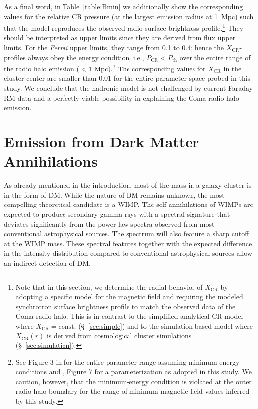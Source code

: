 \documentclass[12pt,manuscript]{aastex}
\def\Fermi{{\em Fermi}\xspace}
\newcommand{\rmn}{\mathrm}
\newcommand{\CR}{\mathrm{CR}}
\begin{document}
As a final word, in Table~\ref{table:Bmin} we additionally show the corresponding values for the
relative CR pressure (at the largest emission radius at 1~Mpc) such that the model reproduces the
observed radio surface brightness profile.\footnote{Note that in this section, we determine the
radial behavior of $X_\CR$ by adopting a specific model for the magnetic field and requiring the
modeled synchrotron surface brightness profile to match the observed data of the Coma radio
halo. This is in contrast to the simplified analytical CR model where $X_\CR=\rmn{const.}$
(\S~\ref{sec:simple}) and to the simulation-based model where $X_\CR(r)$ is derived from
cosmological cluster simulations (\S~\ref{sec:simulation}).} They should be interpreted as upper
limits since they are derived from flux upper limits. For the \Fermi upper limits, they range
from 0.1 to 0.4; hence the $X_{\CR}$-profiles always obey the energy condition, i.e., $P_{\CR} <
P_{\mathrm{th}}$ over the entire range of the radio halo emission ($< 1$ Mpc).\footnote{See Figure 3
in \citet{article:PfrommerEnsslin:2004a} for the entire parameter range assuming minimum energy
conditions and \citet{article:PfrommerEnsslin:2004b}, Figure 7 for a parameterization as adopted in
this study. We caution, however, that the minimum-energy condition is violated at the outer radio
halo boundary for the range of minimum magnetic-field values inferred by this study.} The
corresponding values for $X_\CR$ in the cluster center are smaller than 0.01 for the entire
parameter space probed in this study. We conclude that the hadronic model is not challenged by
current Faraday RM data and a perfectly viable possibility in explaining the Coma radio halo
emission.

%
%

\section{Emission from Dark Matter Annihilations}
As already mentioned in the introduction, most of the mass in a galaxy cluster is in the form of
DM. While the nature of DM remains unknown, the most compelling theoretical candidate is a
WIMP. The self-annihilations of WIMPs are expected to produce secondary gamma rays with a
spectral signature that deviates significantly from the power-law spectra observed from most
conventional astrophysical sources. The spectrum will also feature a sharp cutoff at the WIMP
mass. These spectral features together with the expected difference in the
intensity distribution compared to conventional astrophysical sources allow an
indirect detection of DM.
\end{document}
